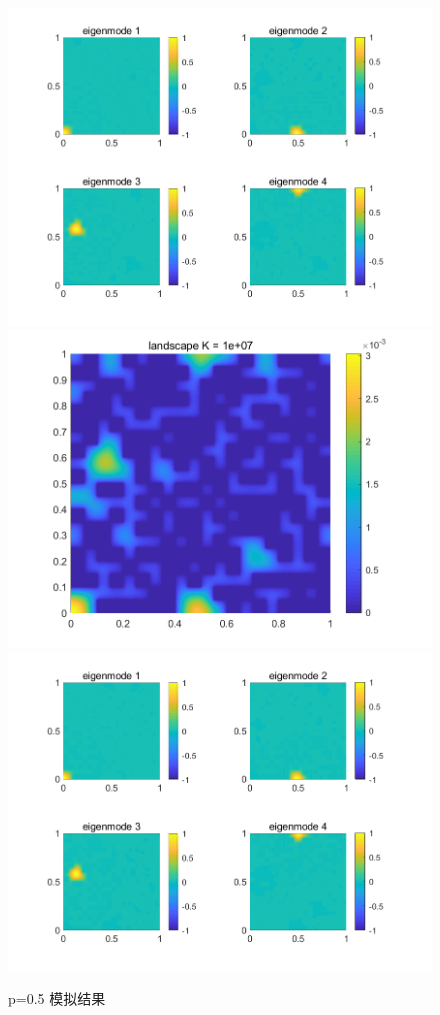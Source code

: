 \documentclass[12pt,a4paper]{article}
\begin{document}
\begin{figure}[htbp]
\includegraphics[width=0.4\linewidth]{potential/P5K3U}
\includegraphics[width=0.4\linewidth]{potential/P5K4W}
\includegraphics[width=0.4\linewidth]{potential/P5K4U}
\caption{p=0.5 模拟结果}
\label{P5}
\end{figure}
\end{document}
